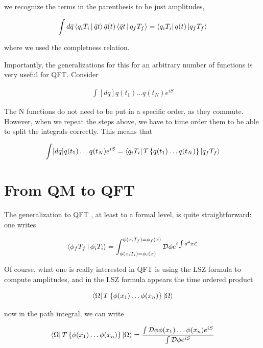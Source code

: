\documentclass{report}
\begin{document}
we recognize the terms in the parenthesis to be just amplitudes, 

\begin{align}
    \int d\bar{q} \Braket{q_i T_i | \bar{q} t} \bar{q}(t)\Braket{\bar{q} t | q_f T_f} = \bra{q_i T_i} q(t) \ket{q_f T_f}
\end{align}

where we used the completness relation. 

Importantly, the generalizations for this for an arbitrary number of functions is very useful for QFT. Consider 

\begin{align}
    \int [dq] q(t_1)\ldots q(t_N) e^{iS}
\end{align}

The N functions do not need to be put in a specific order, as they commute. However, when we repeat the steps above, we have to time order them to be able to split the integrals correctly. This means that 

\begin{align}
    \int [dq] q(t_1)\ldots q(t_N) e^{iS} = \bra{q_i T_i}T\left\{q(t_1)\ldots q(t_N) \right\}\ket{q_f T_f}
\end{align}

\section{From QM to QFT}

The generalization to QFT , at least to a formal level, is quite straightforward: one writes 

\begin{align}
    \Braket{\phi_f T_f | \phi_i T_i} = \int_{\phi(x, T_i) = \phi_i(x)}^{\phi(x, T_f) = \phi_f(x)} \mathcal{D}\phi e^{i \int d^4x \mathcal{L}} 
\end{align}

Of course, what one is really interested in QFT is using the LSZ formula to compute amplitudes, and in the LSZ formula appears the time ordered product 

\begin{align}
    \bra{\Omega}T\left\{\phi(x_1)\ldots \phi(x_n) \right\}\ket{\Omega}
\end{align}

now in the path integral, we can write 

\begin{align}
    \bra{\Omega}T\left\{\phi(x_1)\ldots \phi(x_n) \right\}\ket{\Omega} = \frac{\int \mathcal{D}\phi \phi(x_1)\ldots \phi(x_n)e^{iS}}{\int \mathcal{D}\phi e^{iS}}
\end{align}
\end{document}
